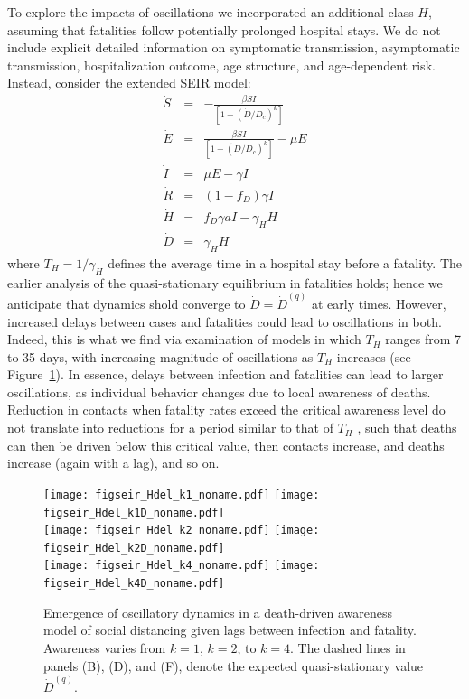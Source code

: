 To explore the impacts of oscillations
we incorporated an additional class $H$,
assuming that fatalities follow potentially prolonged
hospital stays.  We do not include explicit
detailed information on symptomatic transmission, asymptomatic
transmission, hospitalization outcome,
age structure, and age-dependent risk. Instead, 
consider the extended SEIR model:
\begin{eqnarray}
\dot{S} &=& -\frac{\beta SI}{\left[1+\left(\dot{D}/D_c\right)^{k}\right]}\\
\dot{E} &=& \frac{\beta SI}{\left[1+\left(\dot{D}/D_c\right)^{k}\right]}-\mu E\\
\dot{I} &=& \mu E-\gamma I \\
\dot{R} &=& (1-f_D)\gamma I\\
\dot{H} &=& f_D\gamma a I - \gamma_H H\\
\dot{D} &=& \gamma_H H
\end{eqnarray}
where $T_H=1/\gamma_H$ defines the average time in a hospital
stay before a fatality. The earlier analysis of
the quasi-stationary equilibrium in fatalities holds; hence
we anticipate that dynamics shold converge to $\dot{D}=\dot{D}^{(q)}$
at early times. However, increased delays between cases and
fatalities could lead to oscillations in both.  Indeed, this
is what we find via examination of models in which
$T_H$ ranges from 7 to 35 days, with increasing magnitude of
oscillations as $T_H$ increases (see Figure~\ref{fig.oscillate}).
In essence, delays between infection and fatalities can lead to larger oscillations,
as individual behavior changes due to local awareness of deaths.  Reduction in 
contacts when fatality rates exceed the critical awareness level do not translate
into reductions for a period similar to that of $T_H$ , such that deaths can then be driven
below this critical value, then contacts increase, and deaths increase (again with
a lag), and so on.  

\begin{figure}[t!]
\begin{center}
\texttt{[image: figseir\_Hdel\_k1\_noname.pdf]}
\texttt{[image: figseir\_Hdel\_k1D\_noname.pdf]}\\
\texttt{[image: figseir\_Hdel\_k2\_noname.pdf]}
\texttt{[image: figseir\_Hdel\_k2D\_noname.pdf]}\\
\texttt{[image: figseir\_Hdel\_k4\_noname.pdf]}
\texttt{[image: figseir\_Hdel\_k4D\_noname.pdf]}\\
\caption{Emergence of oscillatory dynamics in a death-driven awareness
model of social distancing given lags between infection and fatality.
Awareness varies from $k=1$, $k=2$, to $k=4$.  The dashed
lines in panels (B), (D), and (F), denote the
expected quasi-stationary value $\dot{D}^{(q)}$.
\label{fig.oscillate}}
\end{center}
\end{figure}

